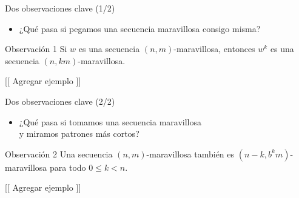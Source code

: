 \documentclass[spanish,xcolor={table}]{beamer}
\begin{document}

\begin{frame}{Dos observaciones clave (1/2)}

\begin{itemize}
  \item ¿Qué pasa si pegamos una secuencia maravillosa consigo misma?
\end{itemize}

\bigskip

\begin{block}{Observación 1}
  Si $w$ es una secuencia $(n,m)$-maravillosa, entonces
  $w^k$ es una secuencia $(n,km)$-maravillosa.
\end{block}

\begin{example}
  {[[ Agregar ejemplo ]]}
\end{example}

\end{frame}


\begin{frame}{Dos observaciones clave (2/2)}

\begin{itemize}
  \item ¿Qué pasa si tomamos una secuencia maravillosa \\
  y miramos patrones más cortos?
\end{itemize}

\bigskip

\begin{block}{Observación 2}
  Una secuencia $(n,m)$-maravillosa también es
  $(n-k,b^km)$-maravillosa para todo $0 \leq k < n$.
\end{block}

\begin{example}
  {[[ Agregar ejemplo ]]}
\end{example}

\end{frame}

\end{document}
